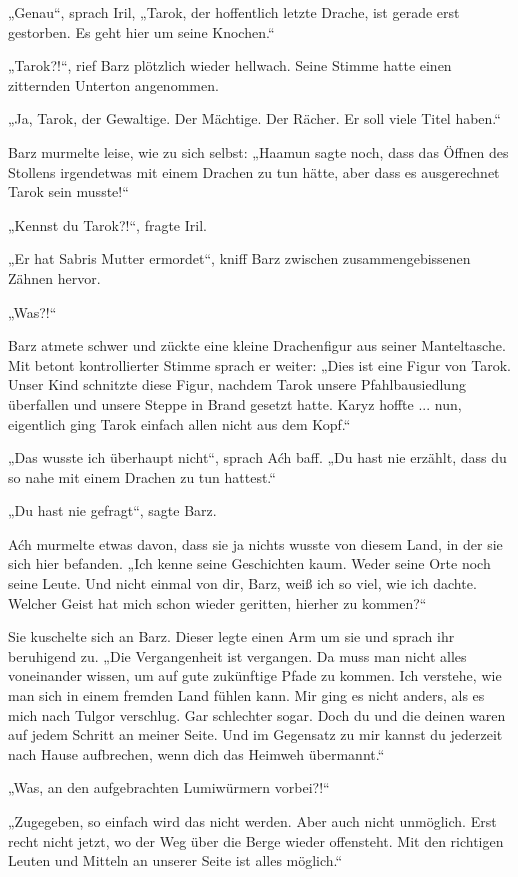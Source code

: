 „Genau“, sprach Iril, „Tarok, der hoffentlich letzte Drache, ist gerade erst gestorben. Es geht hier um seine Knochen.“

„Tarok?!“, rief Barz plötzlich wieder hellwach. Seine Stimme hatte einen zitternden Unterton angenommen.

„Ja, Tarok, der Gewaltige. Der Mächtige. Der Rächer. Er soll viele Titel haben.“

Barz murmelte leise, wie zu sich selbst: „Haamun sagte noch, dass das Öffnen des Stollens irgendetwas mit einem Drachen zu tun hätte, aber dass es ausgerechnet Tarok sein musste!“

„Kennst du Tarok?!“, fragte Iril.

„Er hat Sabris Mutter ermordet“, kniff Barz zwischen zusammengebissenen Zähnen hervor.

„Was?!“

Barz atmete schwer und zückte eine kleine Drachenfigur aus seiner Manteltasche. Mit betont kontrollierter Stimme sprach er weiter: „Dies ist eine Figur von Tarok. Unser Kind schnitzte diese Figur, nachdem Tarok unsere Pfahlbausiedlung überfallen und unsere Steppe in Brand gesetzt hatte. Karyz hoffte ... nun, eigentlich ging Tarok einfach allen nicht aus dem Kopf.“

„Das wusste ich überhaupt nicht“, sprach Aćh baff. „Du hast nie erzählt, dass du so nahe mit einem Drachen zu tun hattest.“

„Du hast nie gefragt“, sagte Barz.

Aćh murmelte etwas davon, dass sie ja nichts wusste von diesem Land, in der sie sich hier befanden. „Ich kenne seine Geschichten kaum. Weder seine Orte noch seine Leute. Und nicht einmal von dir, Barz, weiß ich so viel, wie ich dachte. Welcher Geist hat mich schon wieder geritten, hierher zu kommen?“

Sie kuschelte sich an Barz. Dieser legte einen Arm um sie und sprach ihr beruhigend zu. „Die Vergangenheit ist vergangen. Da muss man nicht alles voneinander wissen, um auf gute zukünftige Pfade zu kommen. Ich verstehe, wie man sich in einem fremden Land fühlen kann. Mir ging es nicht anders, als es mich nach Tulgor verschlug. Gar schlechter sogar. Doch du und die deinen waren auf jedem Schritt an meiner Seite. Und im Gegensatz zu mir kannst du jederzeit nach Hause aufbrechen, wenn dich das Heimweh übermannt.“

„Was, an den aufgebrachten Lumiwürmern vorbei?!“

„Zugegeben, so einfach wird das nicht werden. Aber auch nicht unmöglich. Erst recht nicht jetzt, wo der Weg über die Berge wieder offensteht. Mit den richtigen Leuten und Mitteln an unserer Seite ist alles möglich.“

